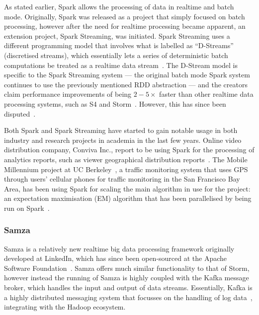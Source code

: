 As stated earlier, Spark allows the processing of data in realtime and batch mode. Originally, Spark was released as a
project that simply focused on batch processing, however after the need for realtime processing became apparent, an
extension project, Spark Streaming, was initiated. Spark Streaming uses a different programming model that involves what
is labelled as ``D-Streams'' (discretised streams), which essentially lets a series of deterministic batch computations
be treated as a realtime data stream~\cite{zaharia2012discretized}. The D-Stream model is specific to the Spark Streaming
system --- the original batch mode Spark system continues to use the previously mentioned RDD abstraction --- and the
creators claim performance improvements of being $2-5\times$ faster than  other realtime data processing systems, such as S4
and Storm~\cite{zaharia2013discretized}. However, this has since been disputed~\cite{web_slideshare_b}.

Both Spark and Spark Streaming have started to gain notable usage in both industry and research projects in academia in
the last few years. Online video distribution company, Conviva Inc., report to be using Spark for the processing of
analytics reports, such as viewer geographical distribution reports~\cite{web_spark_conviva,zaharia2012fast}. The Mobile
Millennium project at UC Berkeley~\cite{web_spark_mmp}, a traffic monitoring system that uses GPS through users'
cellular phones for traffic monitoring in the San Francisco Bay Area, has been using Spark for scaling the main
algorithm in use for the project: an expectation maximisation (EM) algorithm that has been parallelised by being run on
Spark~\cite{hunter2011scaling}.


\subsubsection{Samza} %
\label{ssub:samza}

Samza is a relatively new realtime big data processing framework originally developed at LinkedIn, which has since been
open-sourced at the Apache Software Foundation~\cite{web_samza}. Samza offers much similar functionality to that of
Storm, however instead the running of Samza is highly coupled with the Kafka message broker, which handles the input
and output of data streams. Essentially, Kafka is a highly distributed messaging system that focusses on the handling
of log data~\cite{kreps2011kafka}, integrating with the Hadoop ecosystem.

